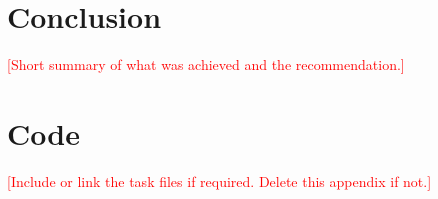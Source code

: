 \documentclass[11pt,a4paper]{article}
\newcommand{\todo}[1]{\textcolor{red}{[#1]}}
\begin{document}
\section{Conclusion}
\todo{Short summary of what was achieved and the recommendation.}


\appendix
\section{Code}
\todo{Include or link the task files if required. Delete this appendix if not.}

% 
\end{document}
